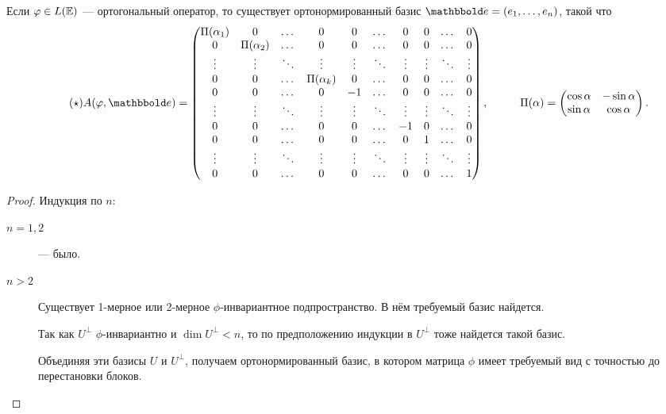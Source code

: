 \begin{theorem}
    Если $\varphi \in L(\mathbb{E})$ --- ортогональный оператор, то существует ортонормированный базис $\E = (e_1, \dots, e_n)$, такой что 
    \begin{equation*}
        \label{lec30:zhopa}
        \tag{$\star$}
        A(\phi, \E) = \begin{pmatrix} 
            \Pi(\alpha_1) & 0 & \dots & 0 & 0 & \dots & 0 & 0 & \dots & 0 \\ 
            0 & \Pi(\alpha_2) & \dots & 0 & 0 & \dots & 0 & 0 & \dots & 0 \\
            \vdots & \vdots & \ddots & \vdots & \vdots & \ddots & \vdots & \vdots & \ddots & \vdots \\
            0 & 0 & \dots & \Pi(\alpha_k) & 0 & \dots & 0 & 0 & \dots & 0 \\
            0 & 0 & \dots & 0 & -1 & \dots & 0& 0 & \dots & 0\\
            \vdots & \vdots & \ddots & \vdots & \vdots & \ddots & \vdots & \vdots & \ddots & \vdots \\
            0 & 0 & \dots & 0 & 0 & \dots & -1 & 0 & \dots & 0\\
            0 & 0 & \dots & 0 & 0 & \dots & 0 & 1 & \dots & 0 \\
            \vdots & \vdots & \ddots & \vdots & \vdots & \ddots & \vdots & \vdots & \ddots & \vdots \\
            0 & 0 & \dots & 0 & 0 & \dots & 0 & 0 & \dots & 1
        \end{pmatrix},
        \hspace{1cm}
        \Pi(\alpha) = \begin{pmatrix} \cos \alpha & -\sin \alpha \\ \sin \alpha & \cos \alpha \end{pmatrix}
    .\end{equation*}
\end{theorem}

\begin{proof}
    Индукция по $n$:
    \begin{description}
    \item[$n = 1, 2$]  --- было.
    \item[$n > 2$] Существует 1-мерное или 2-мерное $\phi$-инвариантное подпространство.
        В нём требуемый базис найдется. 

        Так как $U^{\perp}$ $\phi$-инвариантно и $\dim U^{\perp} < n$, то по предположению индукции в $U^{\perp}$ тоже найдется такой базис.

        Объединяя эти базисы $U$ и $U^{\perp}$, получаем ортонормированный базис, в котором матрица $\phi$ имеет требуемый вид с точностью до перестановки блоков.
        \qedhere
    \end{description}
\end{proof}


